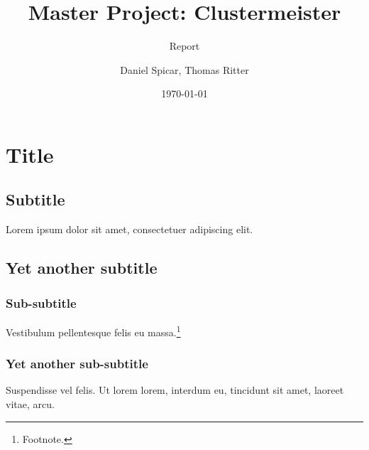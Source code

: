 \documentclass[english]{uzhpub}
\begin{document}
\title{Master Project: Clustermeister}

\subtitle{Report}

\author{Daniel Spicar, Thomas Ritter}

\date{\today}

\maketitle


\section{Title}

\subsection{Subtitle}

Lorem ipsum dolor sit amet, consectetuer adipiscing elit.

\subsection{Yet another subtitle}

\subsubsection{Sub-subtitle}

Vestibulum pellentesque felis eu massa.\footnote{Footnote.}

\subsubsection{Yet another sub-subtitle}

Suspendisse vel felis. Ut lorem lorem, interdum eu, tincidunt sit
amet, laoreet vitae, arcu.










\end{document}
